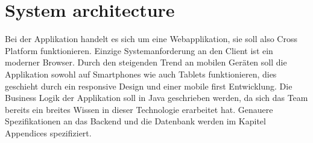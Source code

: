 \chapter{System architecture}
Bei der Applikation handelt es sich um eine Webapplikation, sie soll also \gls{Cross Platform} funktionieren. Einzige Systemanforderung an den Client ist ein moderner Browser. Durch den steigenden Trend an mobilen Geräten soll die Applikation sowohl auf Smartphones wie auch Tablets funktionieren, dies geschieht durch ein \gls{responsive Design} und einer \gls{mobile first} Entwicklung. Die Business Logik der Applikation soll in Java geschrieben werden, da sich das Team bereits ein breites Wissen in dieser Technologie erarbeitet hat. Genauere Spezifikationen an das Backend und die Datenbank werden im Kapitel Appendices spezifiziert.